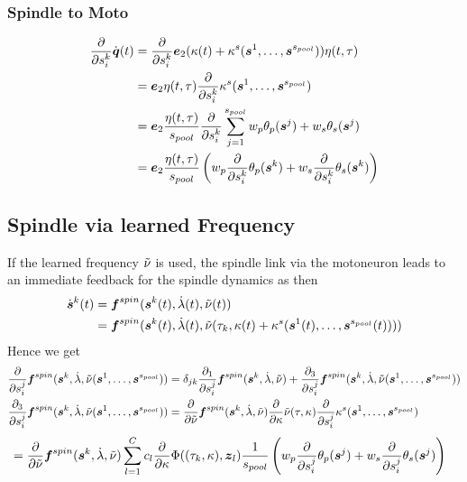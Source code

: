 \subsubsection{Spindle to Moto}
\begin{align}
	\d{}{s^k_i}\dot{\vq}(t) &= \d{}{s^k_i}\ve_2(\kappa(t) + \kappa^s(\vs^1,\ldots,\vs^\mups))\eta(t,\tau)\\
	&= \ve_2\eta(t,\tau)\d{}{s^k_i}\kappa^s(\vs^1,\ldots,\vs^\mups)\\
	&= \ve_2\frac{\eta(t,\tau)}{\mups}\d{}{s^k_i}\sumjmups w_p\theta_p(\vs^j) + w_s\theta_s(\vs^j)\\
	&= \ve_2\frac{\eta(t,\tau)}{\mups}\left(w_p\d{}{s^k_i}\theta_p(\vs^k) + w_s\d{}{s^k_i}\theta_s(\vs^k)\right)
\end{align}

\subsection{Spindle via learned Frequency}
If the learned frequency $\tnu$ is used, the spindle link via the motoneuron leads to an immediate feedback for the spindle dynamics as then
\begin{align}
	\dot{\vs}^k(t) &= \fsp(\vs^k(t),\dla(t),\tnu(t))\\
	&= \fsp(\vs^k(t),\dla(t),\tnu(\tau_k,\kappa(t) + \kappa^s(\vs^1(t),\ldots,\vs^\mups(t))))
\end{align}
Hence we get
\begin{align}
	\d{}{s_i^j}\fsp(\vs^k,\dla,\tnu(\vs^1,\ldots,\vs^\mups)) &= \delta_{jk}\frac{\partial_1}{\partial s_i^j}\fsp(\vs^k,\dla,\tnu)
	 + \frac{\partial_3}{\partial s_i^j}\fsp(\vs^k,\dla,\tnu(\vs^1,\ldots,\vs^\mups))\\
	\frac{\partial_3}{\partial s_i^j}\fsp(\vs^k,\dla,\tnu(\vs^1,\ldots,\vs^\mups))
	&= \d{}{\tnu}\fsp(\vs^k,\dla,\tnu)\d{}{\kappa}\tnu(\tau,\kappa)\d{}{s_i^j}\kappa^s(\vs^1,\ldots,\vs^\mups)
\end{align}
\begin{align}
	[\ldots]&= \d{}{\tnu}\fsp(\vs^k,\dla,\tnu)\suml{l=1}{C}c_l\d{}{\kappa}\Phi((\tau_k,\kappa),\vz_l)
	\frac{1}{\mups}\left(w_p\d{}{s^j_i}\theta_p(\vs^j) + w_s\d{}{s^j_i}\theta_s(\vs^j)\right)
\end{align}

